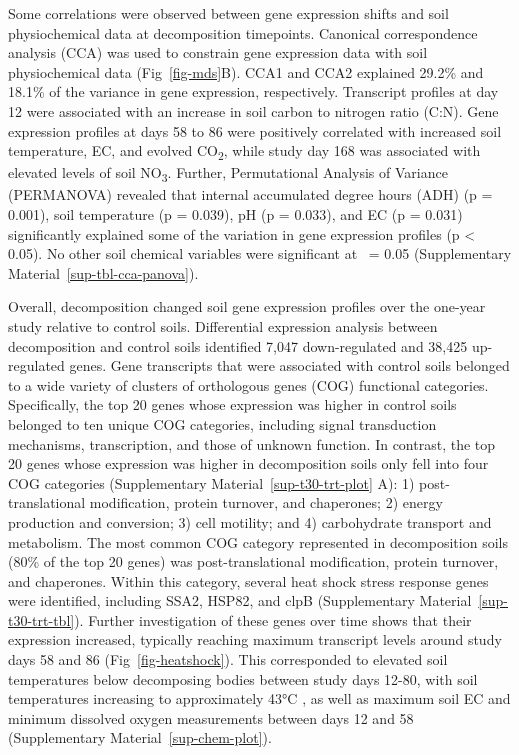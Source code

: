 \documentclass[
  sn-nature,
  lineno, referee]{sn-jnl}
\begin{document}
Some correlations were observed between gene expression shifts and soil
physiochemical data at decomposition timepoints. Canonical
correspondence analysis (CCA) was used to constrain gene expression data
with soil physiochemical data (Fig~\ref{fig-mds}B). CCA1 and CCA2
explained 29.2\% and 18.1\% of the variance in gene expression,
respectively. Transcript profiles at day 12 were associated with an
increase in soil carbon to nitrogen ratio (C:N). Gene expression
profiles at days 58 to 86 were positively correlated with increased soil
temperature, EC, and evolved CO\textsubscript{2}, while study day 168
was associated with elevated levels of soil NO\textsubscript{3}.
Further, Permutational Analysis of Variance (PERMANOVA) revealed that
internal accumulated degree hours (ADH) (p = 0.001), soil temperature (p
= 0.039), pH (p = 0.033), and EC (p = 0.031) significantly explained
some of the variation in gene expression profiles (p \textless{} 0.05).
No other soil chemical variables were significant at \textalpha~= 0.05
(Supplementary Material~\ref{sup-tbl-cca-panova}).

Overall, decomposition changed soil gene expression profiles over the
one-year study relative to control soils. Differential expression
analysis between decomposition and control soils identified 7,047
down-regulated and 38,425 up-regulated genes. Gene transcripts that were
associated with control soils belonged to a wide variety of clusters of
orthologous genes (COG) functional categories. Specifically, the top 20
genes whose expression was higher in control soils belonged to ten
unique COG categories, including signal transduction mechanisms,
transcription, and those of unknown function. In contrast, the top 20
genes whose expression was higher in decomposition soils only fell into
four COG categories (Supplementary Material~\ref{sup-t30-trt-plot} A):
1) post-translational modification, protein turnover, and chaperones; 2)
energy production and conversion; 3) cell motility; and 4) carbohydrate
transport and metabolism. The most common COG category represented in
decomposition soils (80\% of the top 20 genes) was post-translational
modification, protein turnover, and chaperones. Within this category,
several heat shock stress response genes were identified, including
SSA2, HSP82, and clpB (Supplementary Material~\ref{sup-t30-trt-tbl}).
Further investigation of these genes over time shows that their
expression increased, typically reaching maximum transcript levels
around study days 58 and 86 (Fig~\ref{fig-heatshock}). This corresponded
to elevated soil temperatures below decomposing bodies between study
days 12-80, with soil temperatures increasing to approximately 43°C
\citep{taylor_transient_2024}, as well as maximum soil EC and minimum
dissolved oxygen measurements between days 12 and 58
(Supplementary Material~\ref{sup-chem-plot}).
\end{document}
